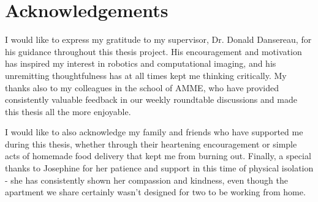 \documentclass[openany]{book}
\begin{document}
\chapter*{Acknowledgements}
I would like to express my gratitude to my supervisor, Dr. Donald Dansereau, for his guidance throughout this thesis project. His encouragement and motivation has inspired my interest in robotics and computational imaging, and his unremitting thoughtfulness has at all times kept me thinking critically. My thanks also to my colleagues in the school of AMME, who have provided consistently valuable feedback in our weekly roundtable discussions and made this thesis all the more enjoyable. 

I would like to also acknowledge my family and friends who have supported me during this thesis, whether through their heartening encouragement or simple acts of homemade food delivery that kept me from burning out. Finally, a special thanks to Josephine for her patience and support in this time of physical isolation - she has consistently shown her compassion and kindness, even though the apartment we share certainly wasn't designed for two to be working from home.

\tableofcontents
\listoffigures
\listoftables

\mainmatter









\newpage



\end{document}
